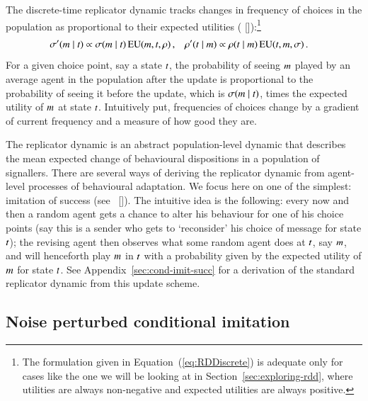 \documentclass[12pt,english]{article}
\numberwithin{equation}{section}
\newcommand{\citepbjps}[1]{(\citeauthor{#1} [\citeyear{#1}])}
\newcommand{\citepbjpspre}[2]{(#1~\citeauthor{#2} [\citeyear{#2}])}
\begin{document}
The discrete-time replicator dynamic tracks changes in frequency of choices in the population
as proportional to their expected utilities
\citepbjps{HofbauerSigmund1998:Evolutionary-Ga}:\footnote{The formulation given in
  Equation~(\ref{eq:RDDiscrete}) is adequate only for cases like the one we will be looking at
  in Section~\ref{sec:exploring-rdd}, where utilities are always non-negative and expected
  utilities are always positive.}
\begin{align}
  \label{eq:RDDiscrete}
  \sigma'(m \mid t) & \propto \sigma(m \mid t) \thinspace
    \mathrm{EU}(m, t,\rho)\,, & \rho'(t \mid m) & \propto \rho(t \mid m) \thinspace
    \mathrm{EU}(t, m,\sigma)\,.   
\end{align}
For a given choice point, say a state $t$, the probability of seeing $m$ played by an
average agent in the population after the update is proportional to the probability of
seeing it before the update, which is $\sigma(m \mid t)$, times the
expected utility of $m$ at state $t$. Intuitively put, frequencies of choices change
by a gradient of current frequency and a measure of how good they are.

The replicator dynamic is an abstract population-level dynamic that describes the mean expected
change of behavioural dispositions in a population of signallers. There are several ways of
deriving the replicator dynamic from agent-level processes of behavioural adaptation. We focus
here on one of the simplest: imitation of success
\citepbjpspre{see}{Sandholm2010:Population-Game}. The intuitive idea is the following: every now and then a random agent gets a chance to alter his behaviour for one
of his choice points (say this is a sender who gets to `reconsider' his choice of message
for state $t$); the revising agent then observes what some random agent does at $t$,
say $m$, and will henceforth play $m$ in $t$ with a probability given by the
expected utility of $m$ for state $t$. See
Appendix~\ref{sec:cond-imit-succ} for a derivation of the standard replicator dynamic from this
update scheme.

\subsection{Noise perturbed conditional imitation}
\label{sec:noisy-repl-dynam}
\end{document}
